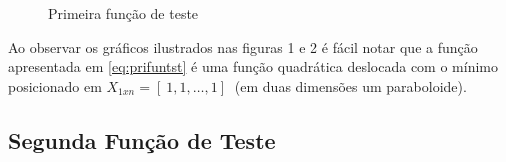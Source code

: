\begin{figure}[h!]
    \centering 
    \qquad
    \qquad
    \caption{Primeira função de teste}%
    \label{fig:prifun}%
\end{figure}
 \FloatBarrier
Ao observar os gráficos ilustrados nas figuras 1 e 2 é fácil notar que a função apresentada em \ref{eq:prifuntst} é uma função quadrática deslocada com o mínimo posicionado em $X_{1xn}=[\ 1 , 1 , \ldots , 1 ]\ $ (em duas dimensões um paraboloide).

\subsection{Segunda Função de Teste}\label{sec:secfun}

